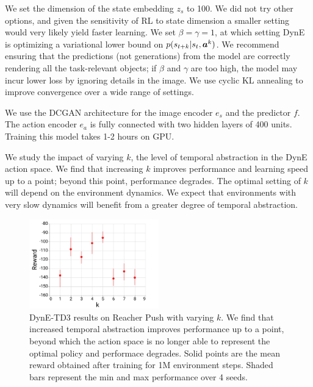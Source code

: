 We set the dimension of the state embedding $z_s$ to 100.
We did not try other options, and given the sensitivity of RL to state dimension a smaller setting would very likely yield faster learning.
We set $\beta = \gamma = 1$, at which setting DynE is optimizing a variational lower bound on $p(s_{t+k} | s_t, {\bm{a}}^k)$.
We recommend ensuring that the predictions (not generations) from the model are correctly rendering all the task-relevant objects; if $\beta$ and $\gamma$ are too high, the model may incur lower loss by ignoring details in the image.
We use cyclic KL annealing \citep{liu2019cyclical} to improve convergence over a wide range of settings.

We use the DCGAN architecture \citep{radford2015unsupervised} for the image encoder $e_s$ and the predictor $f$. The action encoder $e_a$ is fully connected with two hidden layers of 400 units. Training this model takes 1-2 hours on GPU.



\label{sec:varying_k}

We study the impact of varying $k$, the level of temporal abstraction in the DynE action space.
We find that increasing $k$ improves performance and learning speed up to a point; beyond this point, performance degrades.
The optimal setting of $k$ will depend on the environment dynamics.
We expect that environments with very slow dynamics will benefit from a greater degree of temporal abstraction.


\begin{figure}[h]
\centering
\includegraphics[width=0.5\textwidth]{figures/dyne/varying_k_RP.pdf}
\caption{DynE-TD3 results on Reacher Push with varying $k$.
We find that increased temporal abstraction improves performance up to a point, beyond which the action space is no longer able to represent the optimal policy and performace degrades.
Solid points are the mean reward obtained after training for 1M environment steps. Shaded bars represent the min and max performance over 4 seeds.}
\label{fig:varying_k}
\end{figure}





